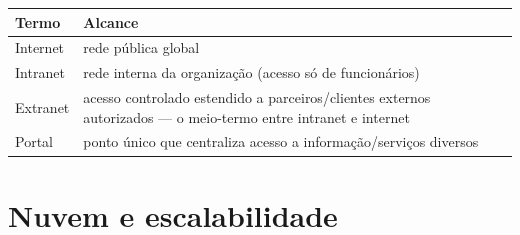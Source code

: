 \begin{conceito}
\begin{center}
\begin{tabular}{@{}p{2.4cm}p{9cm}@{}}
\toprule
\textbf{Termo} & \textbf{Alcance} \\
\midrule
Internet & rede pública global \\
Intranet & rede interna da organização (acesso só de funcionários) \\
Extranet & acesso controlado estendido a parceiros/clientes externos
autorizados --- o meio-termo entre intranet e internet \\
Portal & ponto único que centraliza acesso a informação/serviços diversos \\
\bottomrule
\end{tabular}
\end{center}
\end{conceito}

\section{Nuvem e escalabilidade}
\label{sec:nuvem-teoria}

